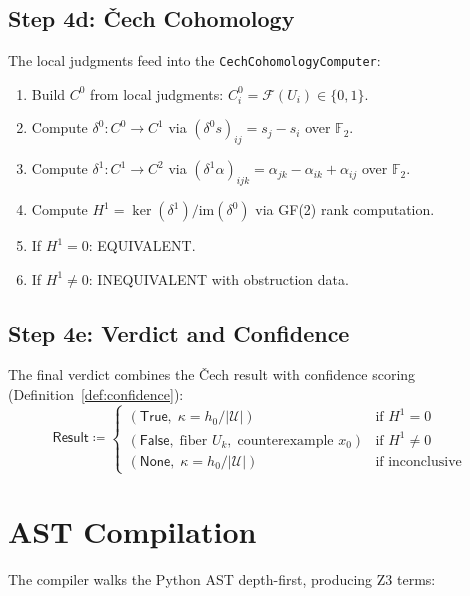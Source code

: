\documentclass[11pt,a4paper]{report}
\theoremstyle{definition}
\theoremstyle{plain}
\newcommand{\covers}{\mathcal{U}}
\newcommand{\Hone}{H^1}
\newcommand{\presheaf}{\mathcal{F}}
\begin{document}
\subsection{Step 4d: \v{C}ech Cohomology}

The local judgments feed into the \texttt{CechCohomologyComputer}:
\begin{enumerate}
  \item Build $C^0$ from local judgments: $C^0_i = \presheaf(U_i)
    \in \{0, 1\}$.
  \item Compute $\delta^0 : C^0 \to C^1$ via
    $(\delta^0 s)_{ij} = s_j - s_i$ over $\mathbb{F}_2$.
  \item Compute $\delta^1 : C^1 \to C^2$ via
    $(\delta^1 \alpha)_{ijk} = \alpha_{jk} - \alpha_{ik} + \alpha_{ij}$
    over $\mathbb{F}_2$.
  \item Compute $\Hone = \ker(\delta^1) / \mathrm{im}(\delta^0)$
    via GF(2) rank computation.
  \item If $\Hone = 0$: EQUIVALENT.
  \item If $\Hone \neq 0$: INEQUIVALENT with obstruction data.
\end{enumerate}

\subsection{Step 4e: Verdict and Confidence}

The final verdict combines the \v{C}ech result with confidence
scoring (Definition~\ref{def:confidence}):
\[
  \mathsf{Result} \coloneqq
  \begin{cases}
    (\mathsf{True},\; \kappa = h_0 / |\covers|)
      & \text{if } \Hone = 0 \\
    (\mathsf{False},\; \text{fiber } U_k,\;
      \text{counterexample } x_0)
      & \text{if } \Hone \neq 0 \\
    (\mathsf{None},\; \kappa = h_0 / |\covers|)
      & \text{if inconclusive}
  \end{cases}
\]

\section{AST Compilation}

The compiler walks the Python AST depth-first, producing Z3 terms:
\end{document}
